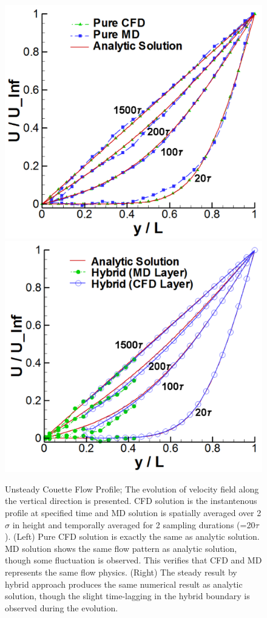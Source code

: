 \documentclass[preprint,12pt]{elsarticle}
\begin{document}
\begin{figure}
\centering
\includegraphics[width=0.6\linewidth]{Flat_Plate_Sol1_New.pdf}
\hskip 1cm
\includegraphics[width=0.6\linewidth]{Flat_Plate_Sol2_New.pdf}
\vskip-0.2cm
\caption{\small Unsteady Couette Flow Profile; The evolution of velocity field along the vertical direction is presented. CFD solution is the instantenous profile at specified time and MD solution is spatially averaged over 2 $\sigma$ in height and temporally averaged for 2 sampling durations (=20$\tau$). (Left) Pure CFD solution is exactly the same as analytic solution. MD solution shows the same flow pattern as analytic solution, though some fluctuation is observed. This verifies that CFD and MD represents the same flow physics. (Right) The steady result by hybrid approach produces the same numerical result as analytic solution, though the slight time-lagging in the hybrid boundary is observed during the evolution.}
\label{Flat_Plate_Sol}
\end{figure}

\end{document}

